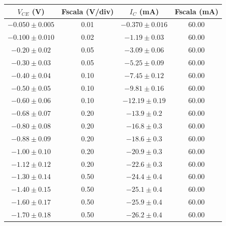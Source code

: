 \documentclass[a4paper,11pt]{article}
\begin{document}
\begin{table}[h!]
  \begin{center}
    \begin{tabular}{c|c|c|c}
      \textbf{$V_{CE}$ (V)} & \textbf{Fscala (V/div)} & \textbf{$I_{C}$ (mA)} & \textbf{Fscala (mA)} \\
      \hline
      $ -0.050 \pm 0.005 $  & 0.01                    & $ -0.370 \pm 0.016 $  & 60.00                \\
      $ -0.100 \pm 0.010 $  & 0.02                    & $ -1.19 \pm 0.03 $    & 60.00                \\
      $ -0.20 \pm 0.02 $    & 0.05                    & $ -3.09 \pm 0.06 $    & 60.00                \\
      $ -0.30 \pm 0.03 $    & 0.05                    & $ -5.25 \pm 0.09 $    & 60.00                \\
      $ -0.40 \pm 0.04 $    & 0.10                    & $ -7.45 \pm 0.12 $    & 60.00                \\
      $ -0.50 \pm 0.05 $    & 0.10                    & $ -9.81 \pm 0.16 $    & 60.00                \\
      $ -0.60 \pm 0.06 $    & 0.10                    & $ -12.19 \pm 0.19 $   & 60.00                \\
      $ -0.68 \pm 0.07 $    & 0.20                    & $ -13.9 \pm 0.2 $     & 60.00                \\
      $ -0.80 \pm 0.08 $    & 0.20                    & $ -16.8 \pm 0.3 $     & 60.00                \\
      $ -0.88 \pm 0.09 $    & 0.20                    & $ -18.6 \pm 0.3 $     & 60.00                \\
      $ -1.00 \pm 0.10 $    & 0.20                    & $ -20.9 \pm 0.3 $     & 60.00                \\
      $ -1.12 \pm 0.12 $    & 0.20                    & $ -22.6 \pm 0.3 $     & 60.00                \\
      $ -1.30 \pm 0.14 $    & 0.50                    & $ -24.4 \pm 0.4 $     & 60.00                \\
      $ -1.40 \pm 0.15 $    & 0.50                    & $ -25.1 \pm 0.4 $     & 60.00                \\
      $ -1.60 \pm 0.17 $    & 0.50                    & $ -25.9 \pm 0.4 $     & 60.00                \\
      $ -1.70 \pm 0.18 $    & 0.50                    & $ -26.2 \pm 0.4 $     & 60.00                \\

\end{tabular}
\end{center}
\end{table}
\end{document}
